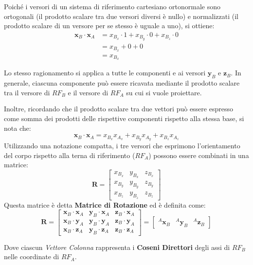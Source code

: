 \documentclass[11pt, a4paper]{report}
\begin{document}
Poiché i versori di un sistema di riferimento cartesiano ortonormale sono ortogonali (il prodotto scalare tra due versori diversi è nullo) e normalizzati (il prodotto scalare di un versore per se stesso è uguale a uno), si ottiene:
\begin{align*}
    \mathbf{x}_B \cdot \mathbf{x}_A &= x_{B_x} \cdot 1 + x_{B_y} \cdot 0 + x_{B_z} \cdot 0 \\
    &= x_{B_x} + 0 + 0\\
    &= x_{B_x}
\end{align*}

Lo stesso ragionamento si applica a tutte le componenti e ai versori $\mathbf{y}_B$ e $\mathbf{z}_B$. In generale, ciascuna componente può essere ricavata mediante il prodotto scalare tra il versore di $RF_B$ e il versore di $RF_A$ su cui si vuole proiettare.

Inoltre, ricordando che il prodotto scalare tra due vettori può essere espresso come somma dei prodotti delle rispettive componenti rispetto alla stessa base, si nota che:
\[
    \mathbf{x}_B \cdot \mathbf{x}_A =
    x_{B_x}x_{A_x} + x_{B_y}x_{A_y} + x_{B_z}x_{A_z}
\]
Utilizzando una notazione compatta, i tre versori che esprimono l'orientamento del corpo rispetto alla terna di riferimento ($RF_A$) possono essere combinati in una matrice:
\[
    \mathbf{R} =
    \begin{bmatrix}
        x_{B_x} & y_{B_x} & z_{B_x}\\
        x_{B_y} & y_{B_y} & z_{B_y}\\
        x_{B_z} & y_{B_z} & z_{B_z}
    \end{bmatrix}
\]
Questa matrice è detta \textbf{Matrice di Rotazione} ed è definita come:
\[
    \mathbf{R} =
    \begin{bmatrix}
        \mathbf{x}_B \cdot \mathbf{x}_A & \mathbf{y}_B \cdot \mathbf{x}_A & \mathbf{z}_B \cdot \mathbf{x}_A\\
        \mathbf{x}_B \cdot \mathbf{y}_A & \mathbf{y}_B \cdot \mathbf{y}_A & \mathbf{z}_B \cdot \mathbf{y}_A\\
        \mathbf{x}_B \cdot \mathbf{z}_A & \mathbf{y}_B \cdot \mathbf{z}_A & \mathbf{z}_B \cdot \mathbf{z}_A
    \end{bmatrix}
    =
    \begin{bmatrix}
        {}^{A}\mathbf{x}_{B} & {}^{A}\mathbf{y}_{B} & {}^{A}\mathbf{z}_{B}
    \end{bmatrix}
\]

Dove ciascun \textit{Vettore Colonna} rappresenta i \textbf{Coseni Direttori} degli assi di $RF_B$ nelle coordinate di $RF_A$.
\newpage
\end{document}
